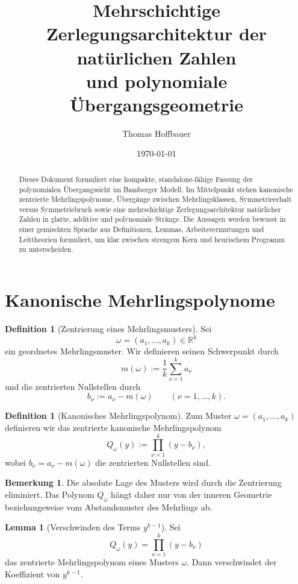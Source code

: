 \documentclass[11pt,a4paper]{article}
\title{Mehrschichtige Zerlegungsarchitektur der natürlichen Zahlen\\
und polynomiale Übergangsgeometrie}
\author{Thomas Hoffbauer}
\date{\today}
\theoremstyle{definition}
\newtheorem{lemma}[satz]{Lemma}
\newtheorem{definition}[satz]{Definition}
\newtheorem{bemerkung}[satz]{Bemerkung}
\begin{document}
\maketitle

\begin{abstract}
Dieses Dokument formuliert eine kompakte, standalone-fähige Fassung der polynomialen Übergangssicht im Bamberger Modell. Im Mittelpunkt stehen kanonische zentrierte Mehrlingspolynome, Übergänge zwischen Mehrlingsklassen, Symmetrieerhalt versus Symmetriebruch sowie eine mehrschichtige Zerlegungsarchitektur natürlicher Zahlen in glatte, additive und polynomiale Stränge. Die Aussagen werden bewusst in einer gemischten Sprache aus Definitionen, Lemmas, Arbeitsvermutungen und Leittheorien formuliert, um klar zwischen strengem Kern und heurischem Programm zu unterscheiden.
\end{abstract}

\tableofcontents

\section{Kanonische Mehrlingspolynome}

\begin{definition}[Zentrierung eines Mehrlingsmusters]
Sei
\[
\omega=(a_1,\dots,a_k)\in\mathbb R^k
\]
ein geordnetes Mehrlingsmuster. Wir definieren seinen Schwerpunkt durch
\[
m(\omega):=\frac{1}{k}\sum_{\nu=1}^k a_\nu
\]
und die zentrierten Nullstellen durch
\[
b_\nu:=a_\nu-m(\omega)\qquad (\nu=1,\dots,k).
\]
\end{definition}

\begin{definition}[Kanonisches Mehrlingspolynom]
Zum Muster \(\omega=(a_1,\dots,a_k)\) definieren wir das zentrierte kanonische Mehrlingspolynom
\[
Q_\omega(y):=\prod_{\nu=1}^k (y-b_\nu),
\]
wobei \(b_\nu=a_\nu-m(\omega)\) die zentrierten Nullstellen sind.
\end{definition}

\begin{bemerkung}
Die absolute Lage des Musters wird durch die Zentrierung eliminiert. Das Polynom \(Q_\omega\) hängt daher nur von der inneren Geometrie beziehungsweise vom Abstandsmuster des Mehrlings ab.
\end{bemerkung}

\begin{lemma}[Verschwinden des Terms \(y^{k-1}\)]
Sei
\[
Q_\omega(y)=\prod_{\nu=1}^k (y-b_\nu)
\]
das zentrierte Mehrlingspolynom eines Musters \(\omega\). Dann verschwindet der Koeffizient von \(y^{k-1}\).
\end{lemma}
\end{document}
